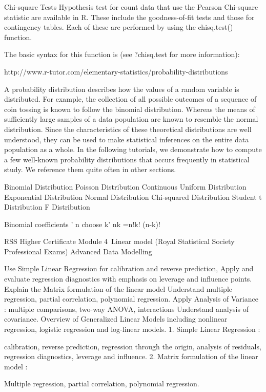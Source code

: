 \documentclass[a4paper,12pt]{article}
\begin{document}
 

Chi-square Tests
Hypothesis test for count data that use the Pearson Chi-square statistic are available in R.
These include the goodness-of-fit tests and those for contingency tables. Each of these are
performed by using the chisq.test() function. 

The basic syntax for this function is (see ?chisq.test for more information): 
 
http://www.r-tutor.com/elementary-statistics/probability-distributions

A probability distribution describes how the values of a random variable is distributed. For example, the collection of all possible outcomes of a sequence of coin tossing is known to follow the binomial distribution. Whereas the means of sufficiently large samples of a data population are known to resemble the normal distribution. Since the characteristics of these theoretical distributions are well understood, they can be used to make statistical inferences on the entire data population as a whole.
In the following tutorials, we demonstrate how to compute a few well-known probability distributions that occurs frequently in statistical study. We reference them quite often in other sections.

Binomial Distribution
Poisson Distribution
Continuous Uniform Distribution
Exponential Distribution
Normal Distribution
Chi-squared Distribution
Student t Distribution
F Distribution


Binomial coefficients
' n choose k'
nk =n!k! (n-k)!

RSS Higher Certificate Module 4 Linear model
(Royal Statistical Society Professional Exams)
Advanced Data Modelling

Use Simple Linear Regression for calibration and reverse prediction,
Apply and evaluate regression diagnostics with emphasis on leverage and influence points.
Explain the Matrix formulation of the linear model
Understand multiple regression, partial correlation, polynomial regression.
Apply Analysis of Variance : multiple comparisons, two-way ANOVA, interactions
Understand analysis of covariance.
Overview of Generalized Linear Models including nonlinear regression, logistic regression and log-linear models.
1. Simple Linear Regression :

calibration, reverse prediction, regression through the origin, analysis of residuals, regression diagnostics, leverage and influence.
2. Matrix formulation of the linear model :

Multiple regression, partial correlation, polynomial regression.
\end{document}
